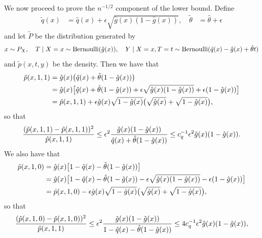 \documentclass{article}
\def\eps{{\epsilon}}
\begin{document}
We now proceed to prove the $n^{-1/2}$ component of the lower bound. Define
\begin{equation}
    \label{eq:square-root-n-dgp}
    \begin{aligned}
        \tilde{q}(x) &= \hat{q}(x) + \eps\sqrt{\hat{g}(x)(1-\hat{g}(x))}, \quad
        \tilde{\theta} &= \hat{\theta} + \eps
    \end{aligned}
\end{equation}
and let $\tilde{P}$ be the distribution generated by
\begin{equation}
    \notag
    x\sim P_X,\quad T\mid X=x \sim \mathrm{Bernoulli}(\hat{g}(x)),\quad Y\mid X=x, T=t \sim \mathrm{Bernoulli}(\tilde{q}(x)-\hat{g}(x)+\tilde{\theta}t)
\end{equation}
and $\tilde{p}(x,t,y)$ be the density. Then we have that
\begin{equation}
    \notag
    \begin{aligned}
        \tilde{p}(x,1,1) &= \hat{g}(x) \big(\tilde{q}(x)+\tilde{\theta}(1-\hat{g}(x))\big) \\
        &= \hat{g}(x) \big[\hat{q}(x)+\hat{\theta} (1-\hat{g}(x)) + \eps\sqrt{\hat{g}(x)(1-\hat{g}(x))} + \eps (1-\hat{g}(x))\big] \\
        &= \hat{p}(x,1,1) + \eps\hat{g}(x)\sqrt{1-\hat{g}(x)}\big(\sqrt{\hat{g}(x)}+\sqrt{1-\hat{g}(x)}\big),
    \end{aligned}
\end{equation}
so that
\begin{equation}
    \notag
    \frac{(\tilde{p}(x,1,1)-\hat{p}(x,1,1))^2}{\hat{p}(x,1,1)} \leq \eps^2 \frac{\hat{g}(x)(1-\hat{g}(x))}{\hat{q}(x)+\hat{\theta}(1-\hat{g}(x))} \leq c_q^{-1}\eps^2 \hat{g}(x)(1-\hat{g}(x)).
\end{equation}
We also have that
\begin{equation}
    \notag
    \begin{aligned}
        \tilde{p}(x,1,0) &= \hat{g}(x)\big[1-\tilde{q}(x)-\tilde{\theta}(1-\hat{g}(x))\big] \\
        &= \hat{g}(x)\big[1-\hat{q}(x)-\hat{\theta} (1-\hat{g}(x)) - \eps\sqrt{\hat{g}(x)(1-\hat{g}(x))} - \eps (1-\hat{g}(x))\big] \\
        &= \hat{p}(x,1,0) - \eps\hat{g}(x)\sqrt{1-\hat{g}(x)}\big(\sqrt{\hat{g}(x)}+\sqrt{1-\hat{g}(x)}\big),
    \end{aligned}
\end{equation}
so that
\begin{equation}
    \notag
    \frac{(\tilde{p}(x,1,0)-\hat{p}(x,1,0))^2}{\hat{p}(x,1,1)} \leq \eps^2 \frac{\hat{g}(x)(1-\hat{g}(x))}{1-\hat{q}(x)-\hat{\theta}(1-\hat{g}(x))} \leq 4c_q^{-1}\eps^2 \hat{g}(x)(1-\hat{g}(x)),
\end{equation}
\end{document}
